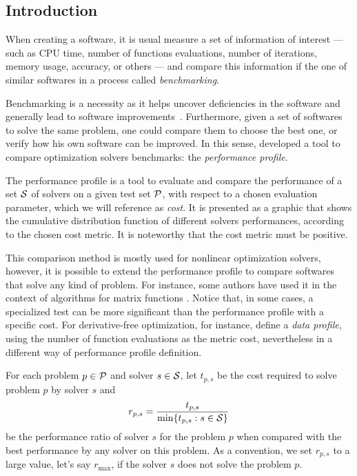\subsection*{Introduction}

    When creating a software, it is usual measure a set of
    information of interest
    --- such as CPU time, number of
    functions evaluations, number of iterations, memory usage, accuracy, or
    others ---
    and compare this information if the one of similar softwares
    in a process called \emph{benchmarking}.

    Benchmarking is a necessity as it
    helps uncover deficiencies in the software and generally lead
    to software
    improvements~\cite{url:mittelmann,Mittelmann:1999fb,Dolan:2006kl}.
    Furthermore, given a set of softwares to solve the same problem, one could
    compare them to choose the best one, or verify how his own software can be
    improved.
    In this sense, \textcite{Dolan:2002du} developed a tool to compare
    optimization solvers benchmarks: the \emph{performance profile}.

    The performance profile is a tool to evaluate and compare the performance
    of a set $\mathcal{S}$ of solvers  on a given test set $\mathcal{P}$, with respect
    to a chosen evaluation parameter,
    which we will reference as \emph{cost}.
    It is presented as
    a graphic that shows the cumulative distribution function of different
    solvers performances, according to the chosen cost metric.
    It is noteworthy that the cost metric must be positive.

    This comparison method is mostly used for nonlinear optimization solvers,
    however, it is possible to extend the performance profile to compare
    softwares that solve any kind of problem.
    For instance, some authors have used it in the context of algorithms for
    matrix functions \cite{al-mohy:2009, al-mohy:2011, al-mohy:2012,
    higham:2005, higham:2009, higham:2011, higham:2013}.
    Notice that, in some cases, a
    specialized test can be more significant than the performance profile with
    a specific cost.  For derivative-free optimization, for instance,
    \textcite{More:2009benchmarking} define a \emph{data profile}, using the
    number of function evaluations as the metric cost, nevertheless in a 
    different way of performance profile definition.

    For each
    problem $p \in \mathcal{P}$ and solver $s \in \mathcal{S}$, let $t_{p,s}$ be the
    cost required to solve problem $p$ by solver $s$ and
    \begin{align*}
      r_{p,s} = \frac{t_{p,s}}{\min\{t_{p,s}: s \in \mathcal{S}\}}
    \end{align*}
    be the performance ratio of solver $s$ for the problem $p$ when compared
    with the best performance by any solver on this problem.
    As a convention, we set $r_{p,s}$ to a large value, let's say $r_{\max}$, if
    the solver $s$ does not solve the problem $p$.

